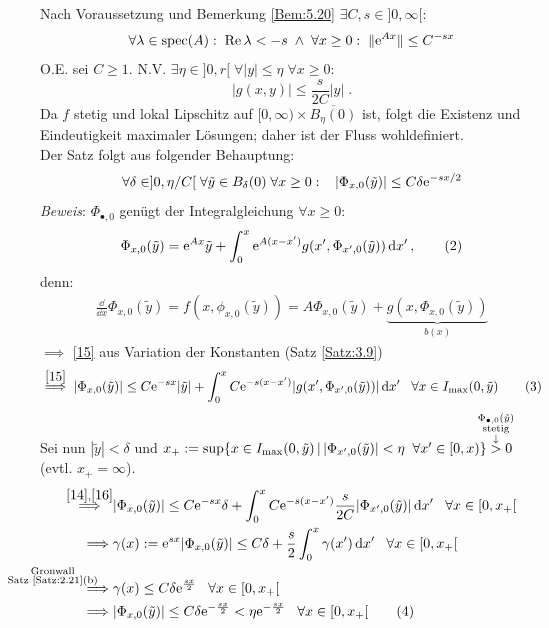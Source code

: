 \documentclass[a4paper]{article}
\begin{document}
\begin{Beweis}
Nach Voraussetzung und Bemerkung \ref{Bem:5.20} $\exists C,s\in]0,\infty[$:
\[\forall \lambda\in\operatorname{\mathrm{spec}}(A):\;\operatorname{\textrm{Re}}\lambda<-s\;\wedge\; \forall x\ge0:\;\|\mathrm{e}^{A x}\|\le C^{-sx}\]
O.E. sei $C\ge 1$. N.V. $\exists\eta\in]0,r[\;\forall |y|\le\eta\;\forall x\ge0$:
\[|g(x,y)|\le\frac{s}{2C}|y|\tag{$1$}\label{14}\;.\]
Da $f$ stetig und lokal Lipschitz auf $[0,\infty)\times\overline{B_{\eta}(0)}$ ist, folgt die Existenz und Eindeutigkeit maximaler Lösungen; daher ist der Fluss wohldefiniert.\\
Der Satz folgt aus folgender Behauptung:
\[\forall \delta\in]0,\eta/C[\;\forall \tilde{y}\in B_{\delta}(0)\;\forall x\ge0:\;\;\;|\Phi_{x,0}(\tilde{y})|\le C\delta\mathrm{e}^{-sx/2}\]
\textit{Beweis}: $\Phi_{\bullet,0}$ genügt der Integralgleichung $\forall x\ge0$:
\[\Phi_{x,0}(\tilde{y})= \mathrm{e}^{Ax}\tilde{y}+\int_0^x\mathrm{e}^{A(x-x')}g(x',\Phi_{x',0}(\tilde{y}))\mathop{}\!\mathrm{d} x'\,,\tag{$2$}\label{15}\]
denn: 
\begin{align*}
\frac{\dd }{\dd x}\Phi_{x,0}(\tilde{y})=f(x,\phi_{x,0}(\tilde{y}))=A\Phi_{x,0}(\tilde{y})+\underbrace{g(x,\Phi_{x,0}(\tilde{y}))}_{b(x)}
\end{align*}
$\implies$ \eqref{15} aus Variation der Konstanten (Satz \ref{Satz:3.9})
\[\overset{\eqref{15}}{\implies}|\Phi_{x,0}(\tilde{y})|\le C\mathrm{e}^{-sx}|\tilde{y}|+\int_0^xC\mathrm{e}^{-s(x-x')}|g(x',\Phi_{x',0}(\tilde{y}))|\mathop{}\!\mathrm{d} x'\;\;\;\forall x\in I_{\max}(0,\tilde{y})\tag{3}\label{16}\]
Sei nun $|\tilde{y}|<\delta$ und $x_+:=\sup\{x\in I_{\max}(0,\tilde{y})\,|\,|\Phi_{x',0}(\tilde{y})|<\eta\;\;\forall x'\in [0,x)\}\overset{\mathclap{\substack{\Phi_{\bullet,0}(\tilde{y})\\\text{stetig}\\\downarrow}}}{>}0$ (evtl. $x_+=\infty$).
\begin{align*}
\overset{\eqref{14},\eqref{16}}{\implies}&|\Phi_{x,0}(\tilde{y})|\le C\e^{-sx}\delta+\int_0^xC\e^{-s(x-x')}\frac{s}{2C}|\Phi_{x',0}(\tilde{y})|\dd x'\;\;\;\forall x\in[0,x_+[\\
\implies&\gamma(x):=\e^{sx}|\Phi_{x,0}(\tilde{y})|\le C\delta+\frac{s}{2}\int_0^x\gamma(x')\dd x'\;\;\;\forall x\in [0,x_+[\\
\overset{\mathllap{\substack{\text{Gronwall}\\\text{Satz \ref{Satz:2.21}(b)}}}}{\implies}& \gamma(x)\le C\delta\e^{\frac{sx}{2}}\;\;\;\forall x\in[0,x_+[\\
\implies& |\Phi_{x,0}(\tilde{y})|\le C\delta\e^{-\frac{sx}{2}}<\eta \e^{-\frac{sx}{2}}\;\;\;\forall x\in[0,x_+[\tag{$4$}\label{17}

\end{align*}
\end{Beweis}
\end{document}
